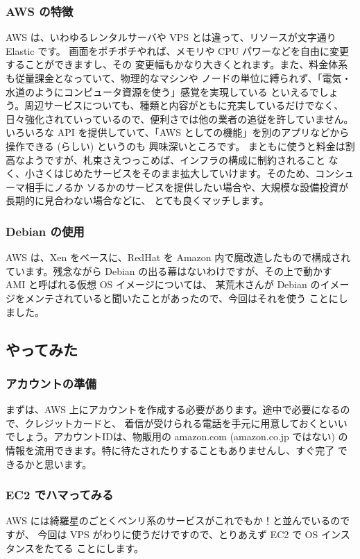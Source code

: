 \documentclass[mingoth,a4paper]{jsarticle}
\begin{document}
\subsubsection{AWS の特徴}
AWS は、いわゆるレンタルサーバや VPS とは違って、リソースが文字通り Elastic です。
画面をポチポチやれば、メモリや CPU パワーなどを自由に変更することができますし、その
変更幅もかなり大きくとれます。また、料金体系も従量課金となっていて、物理的なマシンや
ノードの単位に縛られず、「電気・水道のようにコンピュータ資源を使う」感覚を実現している
といえるでしょう。周辺サービスについても、種類と内容がともに充実しているだけでなく、
日々強化されていっているので、便利さでは他の業者の追従を許していません。いろいろな API
を提供していて、「AWS としての機能」を別のアプリなどから操作できる (らしい) というのも
興味深いところです。
まともに使うと料金は割高なようですが、札束さえつっこめば、インフラの構成に制約されること
なく、小さくはじめたサービスをそのまま拡大していけます。そのため、コンシューマ相手にノるか
ソるかのサービスを提供したい場合や、大規模な設備投資が長期的に見合わない場合などに、
とても良くマッチします。

\subsubsection{Debian の使用}
AWS は、Xen をベースに、RedHat を Amazon 内で魔改造したもので構成されています。残念ながら
Debian の出る幕はないわけですが、その上で動かす AMI と呼ばれる仮想 OS イメージについては、
某荒木さんが Debian のイメージをメンテされていると聞いたことがあったので、今回はそれを使う
ことにしました。

\subsection{やってみた}
\subsubsection{アカウントの準備}
まずは、AWS 上にアカウントを作成する必要があります。途中で必要になるので、クレジットカードと、
着信が受けられる電話を手元に用意しておくといいでしょう。アカウントIDは、物販用の amazon.com
(amazon.co.jp ではない) の情報を流用できます。特に待たされたりすることもありませんし、すぐ完了
できるかと思います。

\subsubsection{EC2 でハマってみる}
AWS には綺羅星のごとくベンリ系のサービスがこれでもか！と並んでいるのですが、
今回は VPS がわりに使うだけですので、とりあえず EC2 で OS インスタンスをたてる
ことにします。
\end{document}
